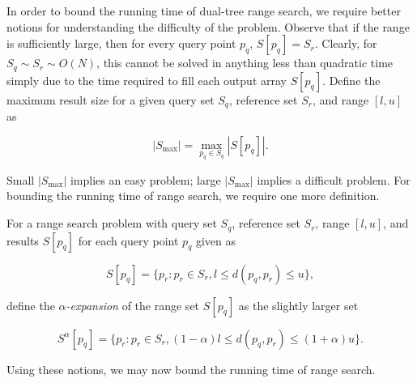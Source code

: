 In order to bound the running time of dual-tree range search, we require better
notions for understanding the difficulty of the problem.  Observe that if the
range is sufficiently large, then for every query point $p_q$, $S[p_q] = S_r$.
Clearly, for $S_q \sim S_r \sim O(N)$, this cannot be solved in anything less
than quadratic time simply due to the time required to fill each output array
$S[p_q]$.  Define the maximum result size for a given query set $S_q$, reference
set $S_r$, and range $[l, u]$ as

\begin{equation}
| S_{\max} | = \max_{p_q \in S_q} | S[p_q] |.
\label{eqn:smax}
\end{equation}

Small $| S_{\max} |$ implies an easy problem; large $| S_{\max} |$ implies a
difficult problem.  For bounding the running time of range search, we require
one more definition.

\begin{defn}
For a range search problem with query set $S_q$, reference set $S_r$, range $[l,
u]$, and results $S[p_q]$ for each query point $p_q$ given as

\begin{equation}
S[p_q] = \{ p_r : p_r \in S_r, l \le d(p_q, p_r) \le u \},
\end{equation}

\noindent define the {\it $\alpha$-expansion} of the range set $S[p_q]$ as the slightly larger set

\begin{equation}
S^{\alpha}[p_q] = \{ p_r : p_r \in S_r, (1 - \alpha) l \le d(p_q, p_r) \le (1 +
\alpha) u \}.
\end{equation}
\end{defn}

Using these notions, we may now bound the running time of range search.


